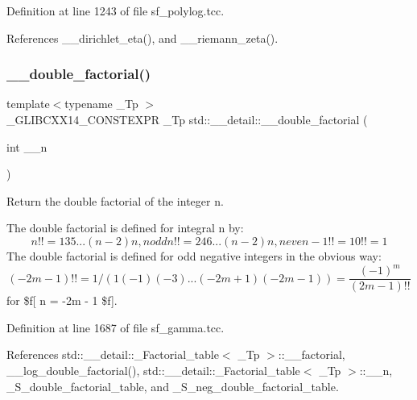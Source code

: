 Definition at line 1243 of file sf\+\_\+polylog.\+tcc.



References \+\_\+\+\_\+dirichlet\+\_\+eta(), and \+\_\+\+\_\+riemann\+\_\+zeta().

\mbox{\label{namespacestd_1_1____detail_a06b0d9786afff0919c96f61d5f760c5f}} 
\subsubsection{\texorpdfstring{\+\_\+\+\_\+double\+\_\+factorial()}{\_\_double\_factorial()}}
{\footnotesize\ttfamily template$<$typename \+\_\+\+Tp $>$ \\
\+\_\+\+G\+L\+I\+B\+C\+X\+X14\+\_\+\+C\+O\+N\+S\+T\+E\+X\+PR \+\_\+\+Tp std\+::\+\_\+\+\_\+detail\+::\+\_\+\+\_\+double\+\_\+factorial (\begin{DoxyParamCaption}\item[{int}]{\+\_\+\+\_\+n }\end{DoxyParamCaption})}



Return the double factorial of the integer n. 

The double factorial is defined for integral n by\+: \[ n!! = 1 3 5 ... (n-2) n, n odd n!! = 2 4 6 ... (n-2) n, n even -1!! = 1 0!! = 1 \] The double factorial is defined for odd negative integers in the obvious way\+: \[ (-2m - 1)!! = 1 / (1 (-1) (-3) ... (-2m + 1) (-2m - 1)) = \frac{(-1)^m}{(2m-1)!!} \] for \$f\mbox{[} n = -\/2m -\/ 1 \$f\mbox{]}. 

Definition at line 1687 of file sf\+\_\+gamma.\+tcc.



References std\+::\+\_\+\+\_\+detail\+::\+\_\+\+Factorial\+\_\+table$<$ \+\_\+\+Tp $>$\+::\+\_\+\+\_\+factorial, \+\_\+\+\_\+log\+\_\+double\+\_\+factorial(), std\+::\+\_\+\+\_\+detail\+::\+\_\+\+Factorial\+\_\+table$<$ \+\_\+\+Tp $>$\+::\+\_\+\+\_\+n, \+\_\+\+S\+\_\+double\+\_\+factorial\+\_\+table, and \+\_\+\+S\+\_\+neg\+\_\+double\+\_\+factorial\+\_\+table.

\mbox{\label{namespacestd_1_1____detail_aa349fe5bcf36d29cfacf6cd3e8aa65b0}} 
